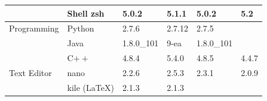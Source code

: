 \begin{table}[!ht]
{\begin{tabular}{|ll|l|l|l|l|}
\rowcolor{black!5}
\cellcolor{white}                                                      & \multicolumn{1}{|l|}{Shell\: zsh}             & 5.0.2                                                               & 5.1.1                                                             & 5.0.2                                                                  & 5.2                                            \\
\hline
\rowcolor{black!10}
\cellcolor{white} Programming                                          & \multicolumn{1}{|l|}{Python}                 & 2.7.6                                                               & 2.7.12                                                            & 2.7.5                                                                  &                                                \\
\rowcolor{black!5}
\cellcolor{white}                                                      & \multicolumn{1}{|l|}{Java}                   & 1.8.0\_101                                                          & 9-ea                                                              & 1.8.0\_101                                                             &                                                \\
\rowcolor{black!10}
\cellcolor{white}                                                      & \multicolumn{1}{|l|}{C$++$}                  & 4.8.4                                                               & 5.4.0                                                             & 4.8.5                                                                  & 4.4.7                                          \\
\hline
\rowcolor{black!5}
\cellcolor{white} Text Editor                                          & \multicolumn{1}{|l|}{nano}                   & 2.2.6                                                               & 2.5.3                                                             & 2.3.1                                                                  & 2.0.9                                          \\
\rowcolor{black!10}
\cellcolor{white}                                                      & \multicolumn{1}{|l|}{kile (\LaTeX)}          & 2.1.3                                                               & 2.1.3                                                             &                                                                        &                                                \\

\end{tabular}}
\end{table}

